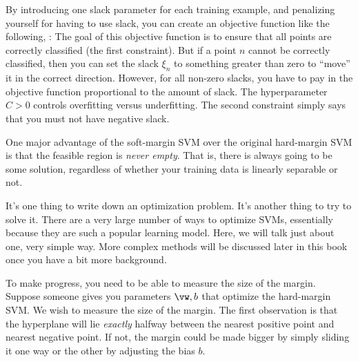 By introducing one slack parameter for each training example, and
penalizing yourself for having to use slack, you can create an
objective function like the following, :
%
%
The goal of this objective function is to ensure that all points are
correctly classified (the first constraint).  But if a point $n$
cannot be correctly classified, then you can set the slack $\xi_n$ to
something greater than zero to ``move'' it in the correct direction.
However, for all non-zero slacks, you have to pay in the objective
function proportional to the amount of slack.  The hyperparameter
$C>0$ controls overfitting versus underfitting.  The second constraint
simply says that you must not have negative slack.


One major advantage of the soft-margin SVM over the original
hard-margin SVM is that the feasible region is \emph{never empty}.
That is, there is always going to be some solution, regardless of
whether your training data is linearly separable or not.


It's one thing to write down an optimization problem.  It's another
thing to try to solve it.  There are a very large number of ways to
optimize SVMs, essentially because they are such a popular learning
model.  Here, we will talk just about one, very simple way.  More
complex methods will be discussed later in this book once you have a
bit more background.

To make progress, you need to be able to measure the size of the
margin.  Suppose someone gives you parameters $\vw,b$ that optimize
the hard-margin SVM.  We wish to measure the size of the margin.  The
first observation is that the hyperplane will lie \emph{exactly}
halfway between the nearest positive point and nearest negative point.
If not, the margin could be made bigger by simply sliding it one way
or the other by adjusting the bias $b$.

